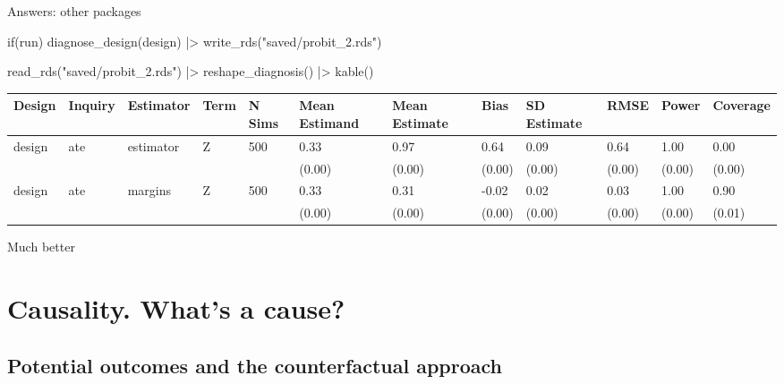 \documentclass[
  11pt,
  ignorenonframetext,
]{beamer}
\newenvironment{Shaded}{\begin{snugshade}}{\end{snugshade}}
\newcommand{\ControlFlowTok}[1]{\textcolor[rgb]{0.00,0.23,0.31}{#1}}
\newcommand{\FunctionTok}[1]{\textcolor[rgb]{0.28,0.35,0.67}{#1}}
\newcommand{\NormalTok}[1]{\textcolor[rgb]{0.00,0.23,0.31}{#1}}
\newcommand{\SpecialCharTok}[1]{\textcolor[rgb]{0.37,0.37,0.37}{#1}}
\newcommand{\StringTok}[1]{\textcolor[rgb]{0.13,0.47,0.30}{#1}}
\begin{document}
\begin{frame}[fragile]{Answers: other packages}
\protect\hypertarget{answers-other-packages-3}{}
\begin{Shaded}
\begin{Highlighting}[]
\ControlFlowTok{if}\NormalTok{(run)}
  \FunctionTok{diagnose\_design}\NormalTok{(design) }\SpecialCharTok{|\textgreater{}} \FunctionTok{write\_rds}\NormalTok{(}\StringTok{"saved/probit\_2.rds"}\NormalTok{)}

\FunctionTok{read\_rds}\NormalTok{(}\StringTok{"saved/probit\_2.rds"}\NormalTok{) }\SpecialCharTok{|\textgreater{}} \FunctionTok{reshape\_diagnosis}\NormalTok{() }\SpecialCharTok{|\textgreater{}} \FunctionTok{kable}\NormalTok{()}
\end{Highlighting}
\end{Shaded}

\begin{tabular}{l|l|l|l|l|l|l|l|l|l|l|l}
\hline
Design & Inquiry & Estimator & Term & N Sims & Mean Estimand & Mean Estimate & Bias & SD Estimate & RMSE & Power & Coverage\\
\hline
design & ate & estimator & Z & 500 & 0.33 & 0.97 & 0.64 & 0.09 & 0.64 & 1.00 & 0.00\\
\hline
 &  &  &  &  & (0.00) & (0.00) & (0.00) & (0.00) & (0.00) & (0.00) & (0.00)\\
\hline
design & ate & margins & Z & 500 & 0.33 & 0.31 & -0.02 & 0.02 & 0.03 & 1.00 & 0.90\\
\hline
 &  &  &  &  & (0.00) & (0.00) & (0.00) & (0.00) & (0.00) & (0.00) & (0.01)\\
\hline
\end{tabular}

Much better
\end{frame}

\hypertarget{causality.-whats-a-cause}{%
\section{\texorpdfstring{Causality. What's a cause?
\label{L_cause}}{Causality. What's a cause? }}\label{causality.-whats-a-cause}}

\hypertarget{potential-outcomes-and-the-counterfactual-approach}{%
\subsection{Potential outcomes and the counterfactual
approach}\label{potential-outcomes-and-the-counterfactual-approach}}
\end{document}
